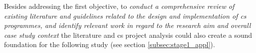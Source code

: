 
Besides addressing the first objective, to \textit{conduct a comprehensive review of existing literature and guidelines related to the design and implementation of \acrlong{cs} programmes, and identify relevant work in regard to the research aim and overall case study context} the literature and \acrshort{cs} project analysis could also create a sound foundation for the following study (see section \ref{subsec:stage1_appl}). %
